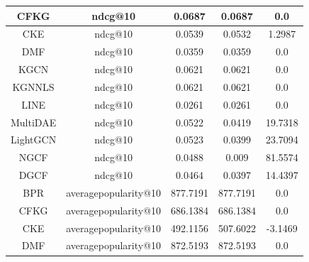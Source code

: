 \begin{table}[H]
{\begin{tabular}{|c|c|c|c|c|}
            CFKG             & ndcg@10           & 0.0687                            & 0.0687                         & 0.0                         \\ \hline
            CKE              & ndcg@10           & 0.0539                            & 0.0532                         & 1.2987                      \\ \hline
            DMF              & ndcg@10           & 0.0359                            & 0.0359                         & 0.0                         \\ \hline
            KGCN             & ndcg@10           & 0.0621                            & 0.0621                         & 0.0                         \\ \hline
            KGNNLS           & ndcg@10           & 0.0621                            & 0.0621                         & 0.0                         \\ \hline
            LINE             & ndcg@10           & 0.0261                            & 0.0261                         & 0.0                         \\ \hline
            MultiDAE         & ndcg@10           & 0.0522                            & 0.0419                         & 19.7318                     \\ \hline
            LightGCN         & ndcg@10           & 0.0523                            & 0.0399                         & 23.7094                     \\ \hline
            NGCF             & ndcg@10           & 0.0488                            & 0.009                          & 81.5574                     \\ \hline
            DGCF             & ndcg@10           & 0.0464                            & 0.0397                         & 14.4397                     \\ \hline
            BPR              & averagepopularity@10 & 877.7191                       & 877.7191                       & 0.0                         \\ \hline
            CFKG             & averagepopularity@10 & 686.1384                       & 686.1384                       & 0.0                         \\ \hline
            CKE              & averagepopularity@10 & 492.1156                       & 507.6022                       & -3.1469                     \\ \hline
            DMF              & averagepopularity@10 & 872.5193                       & 872.5193                       & 0.0                         \\ \hline

\end{tabular}}
\end{table}

